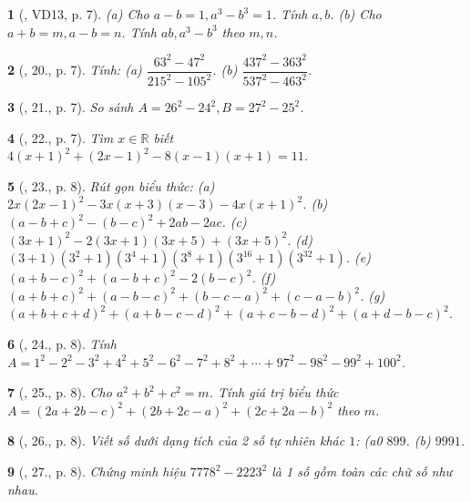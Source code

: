 \documentclass{article}
\newtheorem{baitoan}{}
\begin{document}
\begin{baitoan}[\cite{Binh_Toan_8_tap_1}, VD13, p. 7]
	(a) Cho $a - b = 1,a^3 - b^3 = 1$. Tính $a,b$. (b) Cho $a + b = m,a - b = n$. Tính $ab,a^3 - b^3$ theo $m,n$.
\end{baitoan}

\begin{baitoan}[\cite{Binh_Toan_8_tap_1}, 20., p. 7]
	Tính: (a) $\dfrac{63^2 - 47^2}{215^2 - 105^2}$. (b) $\dfrac{437^2 - 363^2}{537^2 - 463^2}$.
\end{baitoan}

\begin{baitoan}[\cite{Binh_Toan_8_tap_1}, 21., p. 7]
	So sánh $A = 26^2 - 24^2,B = 27^2 - 25^2$.
\end{baitoan}

\begin{baitoan}[\cite{Binh_Toan_8_tap_1}, 22., p. 7]
	Tìm $x\in\mathbb{R}$ biết $4(x + 1)^2 + (2x - 1)^2 - 8(x - 1)(x + 1) = 11$.
\end{baitoan}

\begin{baitoan}[\cite{Binh_Toan_8_tap_1}, 23., p. 8]
	Rút gọn biểu thức: (a) $2x(2x - 1)^2 - 3x(x + 3)(x - 3) - 4x(x + 1)^2$. (b) $(a - b + c)^2 - (b - c)^2 + 2ab - 2ac$. (c) $(3x + 1)^2 - 2(3x + 1)(3x + 5) + (3x + 5)^2$. (d) $(3 + 1)(3^2 + 1)(3^4 + 1)(3^8 + 1)(3^{16} + 1)(3^{32} + 1)$. (e) $(a + b - c)^2 + (a - b + c)^2 - 2(b - c)^2$. (f) $(a + b + c)^2 + (a - b - c)^2 + (b - c - a)^2 + (c - a - b)^2$. (g) $(a + b + c + d)^2 + (a + b - c - d)^2 + (a + c - b - d)^2 + (a + d - b - c)^2$.
\end{baitoan}

\begin{baitoan}[\cite{Binh_Toan_8_tap_1}, 24., p. 8]
	Tính $A = 1^2 - 2^2 - 3^2 + 4^2 + 5^2 - 6^2 - 7^2 + 8^2 + \cdots + 97^2 - 98^2 - 99^2 + 100^2$.
\end{baitoan}

\begin{baitoan}[\cite{Binh_Toan_8_tap_1}, 25., p. 8]
	Cho $a^2 + b^2 + c^2 = m$. Tính giá trị biểu thức $A = (2a + 2b - c)^2 + (2b + 2c - a)^2 + (2c + 2a - b)^2$ theo $m$.
\end{baitoan}

\begin{baitoan}[\cite{Binh_Toan_8_tap_1}, 26., p. 8]
	Viết số dưới dạng tích của 2 số tự nhiên khác $1$: (a0 $899$. (b) $9991$.
\end{baitoan}

\begin{baitoan}[\cite{Binh_Toan_8_tap_1}, 27., p. 8]
	Chứng minh hiệu $7778^2 - 2223^2$ là 1 số gồm toàn các chữ số như nhau.
\end{baitoan}
\end{document}
